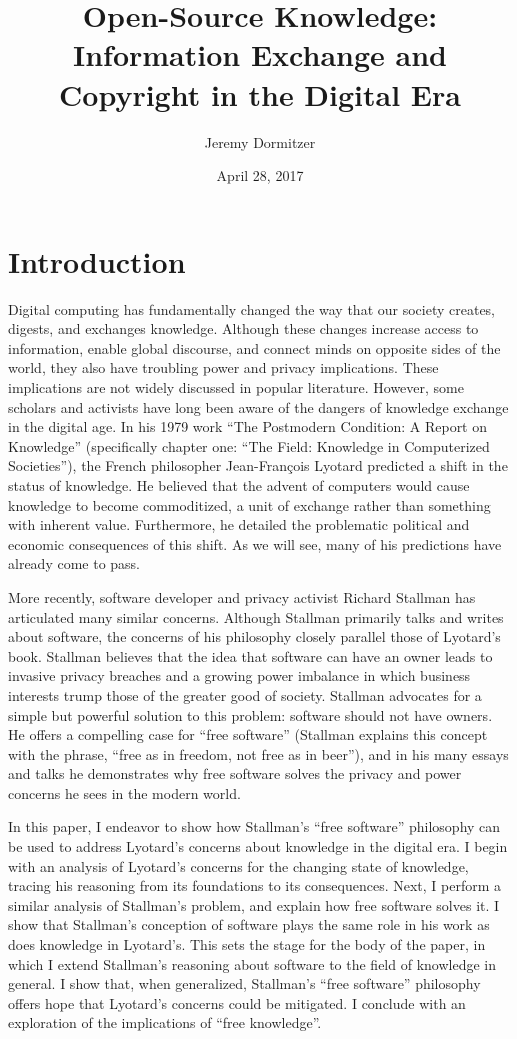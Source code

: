 \documentclass[titlepage]{article}
\title{Open-Source Knowledge: Information Exchange and Copyright in the Digital Era}
\author{Jeremy Dormitzer}
\date{April 28, 2017}
\begin{document}
\maketitle

\section{Introduction}\label{introduction}

Digital computing has fundamentally changed the way that our society
creates, digests, and exchanges knowledge. Although these changes
increase access to information, enable global discourse, and connect
minds on opposite sides of the world, they also have troubling power and
privacy implications. These implications are not widely discussed in
popular literature. However, some scholars and activists have long been
aware of the dangers of knowledge exchange in the digital age. In his
1979 work ``The Postmodern Condition: A Report on Knowledge''
(specifically chapter one: ``The Field: Knowledge in Computerized
Societies''), the French philosopher Jean-François Lyotard predicted a
shift in the status of knowledge. He believed that the advent of
computers would cause knowledge to become commoditized, a unit of
exchange rather than something with inherent value. Furthermore, he
detailed the problematic political and economic consequences of this
shift. As we will see, many of his predictions have already come to
pass.

More recently, software developer and privacy activist Richard Stallman
has articulated many similar concerns. Although Stallman primarily talks
and writes about software, the concerns of his philosophy closely
parallel those of Lyotard's book. Stallman believes that the idea that
software can have an owner leads to invasive privacy breaches and a
growing power imbalance in which business interests trump those of the
greater good of society. Stallman advocates for a simple but powerful
solution to this problem: software should not have owners. He offers a
compelling case for ``free software'' (Stallman explains this concept
with the phrase, ``free as in freedom, not free as in beer''), and in
his many essays and talks he demonstrates why free software solves the
privacy and power concerns he sees in the modern world.

In this paper, I endeavor to show how Stallman's ``free software''
philosophy can be used to address Lyotard's concerns about knowledge in
the digital era. I begin with an analysis of Lyotard's concerns for the
changing state of knowledge, tracing his reasoning from its foundations
to its consequences. Next, I perform a similar analysis of Stallman's
problem, and explain how free software solves it. I show that Stallman's
conception of software plays the same role in his work as does knowledge
in Lyotard's. This sets the stage for the body of the paper, in which I
extend Stallman's reasoning about software to the field of knowledge in
general. I show that, when generalized, Stallman's ``free software''
philosophy offers hope that Lyotard's concerns could be mitigated. I
conclude with an exploration of the implications of ``free knowledge''.
\end{document}

